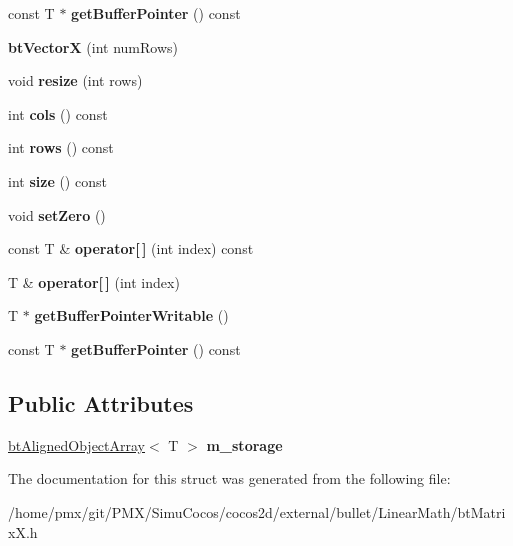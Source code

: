 \begin{DoxyCompactItemize}
\mbox{\label{structbtVectorX_a3f303f6cae221da408cef9ae8c76a4b6}} 
const T $\ast$ {\bfseries get\+Buffer\+Pointer} () const
\item 
\mbox{\label{structbtVectorX_a5919baf0daf9dca9c1821ad33b6e2eb3}} 
{\bfseries bt\+VectorX} (int num\+Rows)
\item 
\mbox{\label{structbtVectorX_a604e385e856a599fc2126a7804cfa856}} 
void {\bfseries resize} (int rows)
\item 
\mbox{\label{structbtVectorX_ab14c5901eb1772963afecbc538d2d018}} 
int {\bfseries cols} () const
\item 
\mbox{\label{structbtVectorX_a9b0a99c060ce90414fd62daf2499ec22}} 
int {\bfseries rows} () const
\item 
\mbox{\label{structbtVectorX_a3905bfcb185adf8e7e73fe611864b6e0}} 
int {\bfseries size} () const
\item 
\mbox{\label{structbtVectorX_adcc796091625d29f1e5ebef76753846f}} 
void {\bfseries set\+Zero} ()
\item 
\mbox{\label{structbtVectorX_a921a3b39b3dc135e4ef9dfaf26b25084}} 
const T \& {\bfseries operator\mbox{[}$\,$\mbox{]}} (int index) const
\item 
\mbox{\label{structbtVectorX_a5b6c10204cdcb48c4124243b979c4dcb}} 
T \& {\bfseries operator\mbox{[}$\,$\mbox{]}} (int index)
\item 
\mbox{\label{structbtVectorX_aea4bc1aaef22a96a1090435a7d026b0c}} 
T $\ast$ {\bfseries get\+Buffer\+Pointer\+Writable} ()
\item 
\mbox{\label{structbtVectorX_a3f303f6cae221da408cef9ae8c76a4b6}} 
const T $\ast$ {\bfseries get\+Buffer\+Pointer} () const
\end{DoxyCompactItemize}
\subsection*{Public Attributes}
\begin{DoxyCompactItemize}
\item 
\mbox{\label{structbtVectorX_ad6a89f6557f45542863eaa99aa4ffc4a}} 
\hyperlink{classbtAlignedObjectArray}{bt\+Aligned\+Object\+Array}$<$ T $>$ {\bfseries m\+\_\+storage}
\end{DoxyCompactItemize}


The documentation for this struct was generated from the following file\+:\begin{DoxyCompactItemize}
\item 
/home/pmx/git/\+P\+M\+X/\+Simu\+Cocos/cocos2d/external/bullet/\+Linear\+Math/bt\+Matrix\+X.\+h\end{DoxyCompactItemize}
